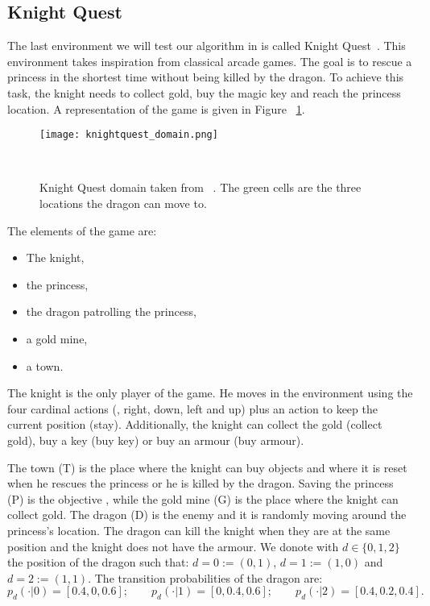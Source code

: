\subsection{Knight Quest}
The last environment we will test our algorithm in is called Knight Quest~\cite{DBLP:conf/icml/FruitPLO18}. This environment takes inspiration from classical arcade games. The goal is to rescue a princess in the shortest time without being killed by the dragon. To achieve this task, the knight needs to collect gold, buy the magic key and reach the princess location. A representation of the game is given in Figure ~\ref{fig:knightquest_domain}.\par
\begin{figure}
 \texttt{[image: knightquest\_domain.png]}
 \caption{Knight Quest domain taken from ~\cite{DBLP:conf/icml/FruitPLO18}. The green cells are the three locations the dragon can move to.} ~
\label{fig:knightquest_domain}
\end{figure}
The elements of the game are:
\begin{itemize}
\item The knight,
\item the princess,
\item the dragon patrolling the princess,
\item a gold mine,
\item a town.
\end{itemize}
The knight is the only player of the game.  He moves in the environment using the four cardinal actions (\ie, right, down, left and up) plus an action to keep the current position (stay). Additionally, the knight can collect the gold (collect gold), buy a key (buy key) or buy an armour (buy armour).\par
The town (T) is the place where the knight can buy objects and where it is reset when he rescues the princess or he is killed by the dragon. Saving the princess (P) is the objective , while the gold mine (G) is the place where the knight can collect gold. The dragon (D) is the enemy and it is randomly moving around the princess's location. The dragon can kill the knight when they are at the same position and the knight does not have the armour. We donote with $d \in \{0,1,2\}$ the position of the dragon such that: $d = 0 := (0,1)$, $d= 1 := (1,0)$ and $d= 2 := (1,1)$. The transition probabilities of the dragon are:
\begin{equation*}
p_d(\cdot \vert 0)=[0.4,0,0.6]; \qquad p_d(\cdot \vert 1)=[0,0.4,0.6]; \qquad p_d(\cdot \vert 2)=[0.4,0.2,0.4]. 
\end{equation*}
